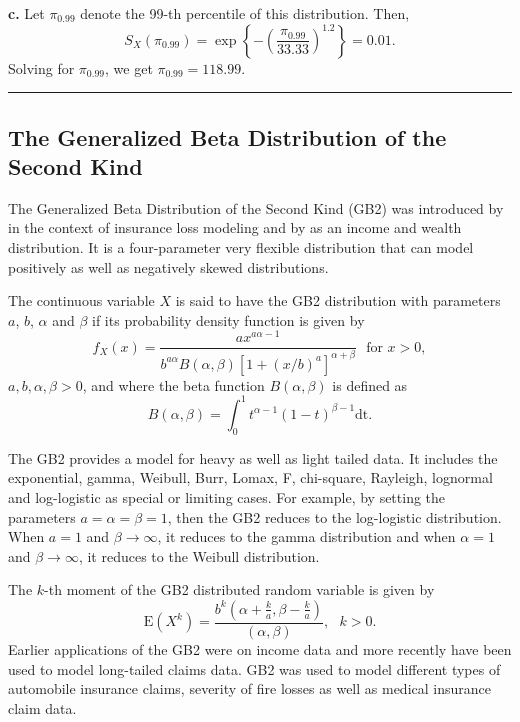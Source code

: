 \documentclass[]{book}
\theoremstyle{definition}
\theoremstyle{definition}
\theoremstyle{definition}
\theoremstyle{remark}
\begin{document}
\textbf{c.} Let \(\pi_{0.99}\) denote the 99-th percentile of this
distribution. Then,
\[S_{X}\left( \pi_{0.99} \right) = \exp\left\{- \left( \frac{\pi_{0.99}}{33.33} \right)^{1.2}\right\} = 0.01.\]
Solving for \(\pi_{0.99}\), we get \(\pi_{0.99} = 118.99\).

\begin{center}\rule{0.5\linewidth}{\linethickness}\end{center}

\subsection{The Generalized Beta Distribution of the Second
Kind}\label{the-generalized-beta-distribution-of-the-second-kind}

The Generalized Beta Distribution of the Second Kind (GB2) was
introduced by \citet{venter1983transformed} in the context of insurance
loss modeling and by \citet{mcdonald1984some} as an income and wealth
distribution. It is a four-parameter very flexible distribution that can
model positively as well as negatively skewed distributions.

The continuous variable \(X\) is said to have the GB2 distribution with
parameters \(a\), \(b\), \(\alpha\) and \(\beta\) if its probability
density function is given by
\[f_{X}\left( x \right) = \frac{ax^{a \alpha - 1}}{b^{a \alpha}B\left( \alpha,\beta \right)\left\lbrack 1 + \left( x/b \right)^{a} \right\rbrack^{\alpha + \beta}} \ \ \ \text{for } x > 0,\]
\(a,b,\alpha,\beta > 0\), and where the beta function
\(B\left( \alpha,\beta \right)\) is defined as
\[B\left( \alpha,\beta \right) = \int_{0}^{1}{t^{\alpha - 1}\left( 1 - t \right)^{\beta - 1}}\text{dt}.\]

The GB2 provides a model for heavy as well as light tailed data. It
includes the exponential, gamma, Weibull, Burr, Lomax, F, chi-square,
Rayleigh, lognormal and log-logistic as special or limiting cases. For
example, by setting the parameters \(a = \alpha = \beta = 1\), then the
GB2 reduces to the log-logistic distribution. When \(a = 1\) and
\(\beta \rightarrow \infty\), it reduces to the gamma distribution and
when \(\alpha = 1\) and \(\beta \rightarrow \infty\), it reduces to the
Weibull distribution.

The \(k\)-th moment of the GB2 distributed random variable is given by
\[\mathrm{E}\left( X^{k} \right) = \frac{b^{k}\left( \alpha + \frac{k}{a},\beta - \frac{k}{a} \right)}{\left( \alpha,\beta \right)}, \ \ \ k > 0.\]
Earlier applications of the GB2 were on income data and more recently
have been used to model long-tailed claims data. GB2 was used to model
different types of automobile insurance claims, severity of fire losses
as well as medical insurance claim data.
\end{document}
